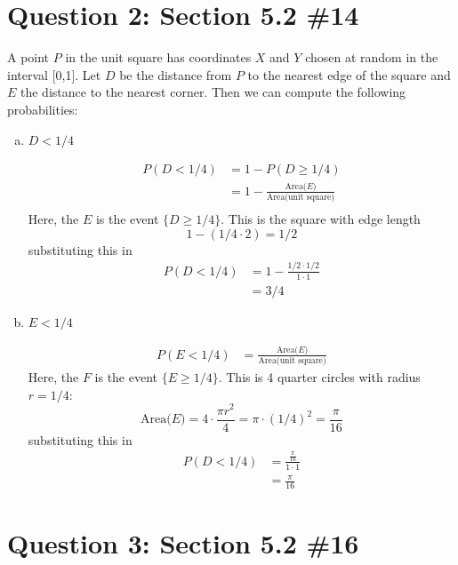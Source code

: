 \documentclass[11pt, oneside]{article}   	%
\begin{document}
\section*{Question 2: Section 5.2 \#14}

A point $P$ in the unit square has coordinates $X$ and $Y$ chosen at random in the interval [0,1]. Let $D$ be the distance from $P$ to the nearest edge of the square and $E$ the distance to the nearest corner. Then we can compute the following probabilities:

\begin{enumerate}[(a)]
	\item $D <1/4$
		
	\begin{align*}
		P(D < 1/4) & = 1 -P(D \geq 1/4) \\
		& = 1 - \frac{\text{Area($E$)}}{\text{Area(unit square)}} \\
	\end{align*}
	Here, the $E$ is the event $\{D \geq 1/4\}$. This is the square with edge length
	$$1-(1/4 \cdot 2) = 1/2$$
	substituting this in
	\begin{align*}
		P(D < 1/4) & = 1 - \frac{1/2 \cdot 1/2}{1 \cdot 1} \\
		& = 3/4
	\end{align*}
	\item $E <1/4$
		
	\begin{align*}
		P(E < 1/4) & = \frac{\text{Area($E$)}}{\text{Area(unit square)}}
	\end{align*}
	Here, the $F$ is the event $\{E \geq 1/4\}$. This is 4 quarter circles with radius $r=1/4$:
	$$\text{Area($E$)} = 4 \cdot \frac{\pi r^2}{4} = \pi \cdot (1/4)^2 = \frac{\pi}{16}$$
	substituting this in
	\begin{align*}
		P(D < 1/4) & = \frac{\frac{\pi}{16}}{1 \cdot 1} \\
		& = \frac{\pi}{16}
	\end{align*}
		
\end{enumerate}


\section*{Question 3: Section 5.2 \#16}
\end{document}
